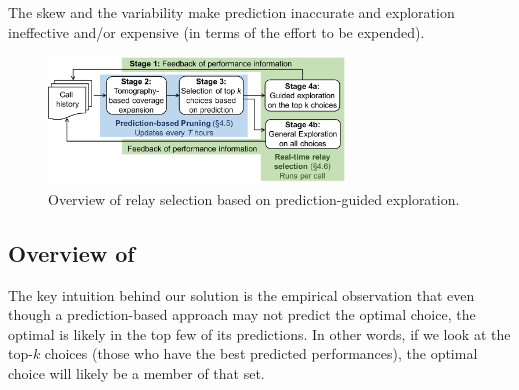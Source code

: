 The skew and the variability make prediction inaccurate and exploration ineffective and/or expensive (in terms of the effort to be expended).



\begin{figure}[t!]
\centering
\includegraphics[width=0.7\textwidth]{figures/Via-Overview-new-ethan.pdf}
\caption{Overview of \hybrid relay selection based on prediction-guided exploration.}
\label{fig:intuition}
\end{figure}

\subsection{Overview of \hybrid}
\label{subsec:Via-approach}

The key intuition behind our solution is the empirical observation that even though a prediction-based approach 
may not predict the optimal choice, the optimal is likely in the top few of its predictions. In other words, if we look at the top-$k$ choices 
(those who have the best predicted performances), the optimal choice will likely be a member of that set.%


